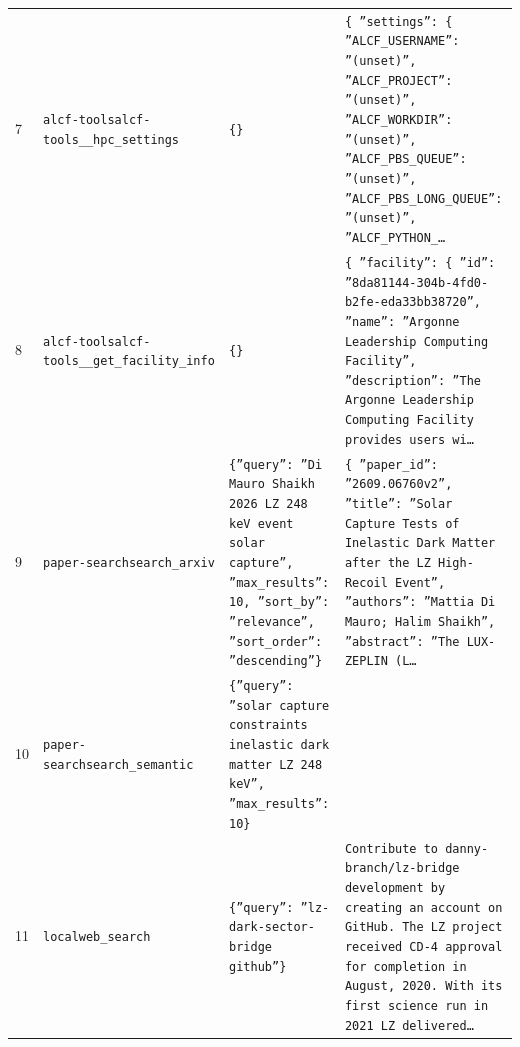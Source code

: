 \documentclass[11pt,a4paper]{article}
\begin{document}
\begin{longtable}{@{}p{}p{}p{}p{}@{}}
7 & \texttt{alcf-tools}\newline\texttt{alcf-tools\_\allowbreak{}\_\allowbreak{}hpc\_\allowbreak{}settings} & \texttt{\{\}\allowbreak{}} & \texttt{\{   ''settings'':\allowbreak{} \{     ''ALCF\_\allowbreak{}USERNAME'':\allowbreak{} ''(unset)\allowbreak{}'',\allowbreak{}     ''ALCF\_\allowbreak{}PROJECT'':\allowbreak{} ''(unset)\allowbreak{}'',\allowbreak{}     ''ALCF\_\allowbreak{}WORKDIR'':\allowbreak{} ''(unset)\allowbreak{}'',\allowbreak{}     ''ALCF\_\allowbreak{}PBS\_\allowbreak{}QUEUE'':\allowbreak{} ''(unset)\allowbreak{}'',\allowbreak{}     ''ALCF\_\allowbreak{}PBS\_\allowbreak{}LONG\_\allowbreak{}QUEUE'':\allowbreak{} ''(unset)\allowbreak{}'',\allowbreak{}     ''ALCF\_\allowbreak{}PYTHON\_\allowbreak{}\ldots{}\allowbreak{}} \\
8 & \texttt{alcf-tools}\newline\texttt{alcf-tools\_\allowbreak{}\_\allowbreak{}get\_\allowbreak{}facility\_\allowbreak{}info} & \texttt{\{\}\allowbreak{}} & \texttt{\{   ''facility'':\allowbreak{} \{     ''id'':\allowbreak{} ''8da81144-304b-4fd0-b2fe-eda33bb38720'',\allowbreak{}     ''name'':\allowbreak{} ''Argonne Leadership Computing Facility'',\allowbreak{}     ''description'':\allowbreak{} ''The Argonne Leadership Computing Facility provides users wi\ldots{}\allowbreak{}} \\
9 & \texttt{paper-search}\newline\texttt{search\_\allowbreak{}arxiv} & \texttt{\{''query'':\allowbreak{} ''Di Mauro Shaikh 2026 LZ 248 keV event solar capture'',\allowbreak{} ''max\_\allowbreak{}results'':\allowbreak{} 10,\allowbreak{} ''sort\_\allowbreak{}by'':\allowbreak{} ''relevance'',\allowbreak{} ''sort\_\allowbreak{}order'':\allowbreak{} ''descending''\}\allowbreak{}} & \texttt{\{   ''paper\_\allowbreak{}id'':\allowbreak{} ''2609.06760v2'',\allowbreak{}   ''title'':\allowbreak{} ''Solar Capture Tests of Inelastic Dark Matter after the LZ High-Recoil Event'',\allowbreak{}   ''authors'':\allowbreak{} ''Mattia Di Mauro;\allowbreak{} Halim Shaikh'',\allowbreak{}   ''abstract'':\allowbreak{} ''The LUX-ZEPLIN (L\ldots{}\allowbreak{}} \\
10 & \texttt{paper-search}\newline\texttt{search\_\allowbreak{}semantic} & \texttt{\{''query'':\allowbreak{} ''solar capture constraints inelastic dark matter LZ 248 keV'',\allowbreak{} ''max\_\allowbreak{}results'':\allowbreak{} 10\}\allowbreak{}} & \texttt{} \\
11 & \texttt{local}\newline\texttt{web\_\allowbreak{}search} & \texttt{\{''query'':\allowbreak{} ''lz-dark-sector-bridge github''\}\allowbreak{}} & \texttt{Contribute to danny-branch/\allowbreak{}lz-bridge development by creating an account on GitHub. The LZ project received CD-4 approval for completion in August,\allowbreak{} 2020. With its first science run in 2021 LZ delivered\ldots{}\allowbreak{}} \\

\end{longtable}
\end{document}
